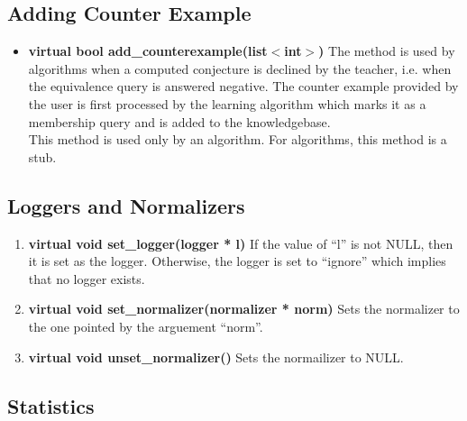 \subsection*{Adding Counter Example}

\begin{itemize}
 \item \textbf{virtual bool add\_counterexample(list$<$int$>$)} \vskip 1pt
	The method is used by \online algorithms when a computed conjecture is declined by the teacher, i.e. when the equivalence query is answered negative. The counter example provided by the user is first processed by the learning algorithm which marks it as a membership query and is added to the knowledgebase. \\
	This method is used only by an \online algorithm. For \offline algorithms, this method is a stub.
\end{itemize}

\subsection*{Loggers and Normalizers}

\begin{enumerate}
 \item \textbf{virtual void set\_logger(logger * l)} \vskip 1pt
	If the value of ``l'' is not NULL, then it is set as the logger. Otherwise, the logger is set to ``ignore'' which implies that no logger exists.

 \item \textbf{virtual void set\_normalizer(normalizer * norm)} \vskip 1pt
	Sets the normalizer to the one pointed by the arguement ``norm''.

 \item \textbf{virtual void unset\_normalizer()} \vskip 1pt
	Sets the normailizer to NULL. 
\end{enumerate}

\subsection*{Statistics}

